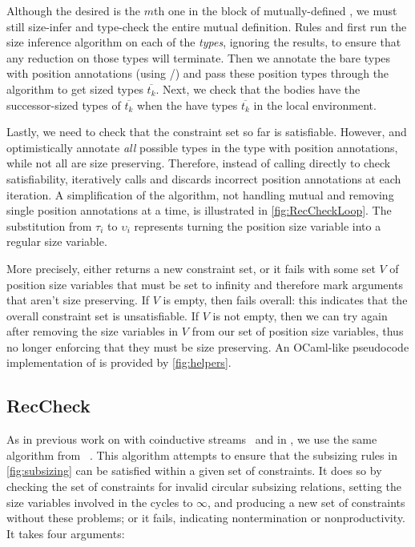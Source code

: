 Although the desired \cofixpoint is the $m$th one in the block of mutually-defined \cofixpoints, we must still size-infer and type-check the entire mutual definition.
Rules  and  first run the size inference algorithm on each of the \cofixpoint \emph{types}, ignoring the results, to ensure that any reduction on those types will terminate.
Then we annotate the bare types with position annotations (using \setrecstars/\setcorecstars) and pass these position types through the algorithm to get sized types $\overline{t_k}$.
Next, we check that the \cofixpoint bodies have the successor-sized types of $\overline{t_k}$ when the \cofixpoints have types $\overline{t_k}$ in the local environment.




Lastly, we need to check that the constraint set so far is satisfiable.
However, \setrecstars and \setcorecstars optimistically annotate \textit{all} possible \coinductive types in the \cofixpoint type with position annotations, while not all \cofixpoints are size preserving.
Therefore, instead of calling \RecCheck directly to check satisfiability,
\RecCheckLoop iteratively calls \RecCheck and discards incorrect position annotations at each iteration.
A simplification of the algorithm, not handling mutual \cofixpoints and removing single position annotations at a time,
is illustrated in \autoref{fig:RecCheckLoop}.
The substitution from $\tau_i$ to $\upsilon_i$ represents turning the position size variable into a regular size variable.

More precisely, \RecCheck either returns a new constraint set,
or it fails with some set $V$ of position size variables that must be set to infinity
and therefore mark arguments that aren't size preserving.
If $V$ is empty, then \RecCheckLoop fails overall: this indicates that the overall constraint set is unsatisfiable.
If $V$ is not empty, then we can try \RecCheck again after removing the size variables in $V$ from our set of position size variables,
thus no longer enforcing that they must be size preserving.
An OCaml-like pseudocode implementation of \RecCheckLoop is provided by \autoref{fig:helpers}.

\subsection{RecCheck}\label{sec:algorithm:reccheck}

As in previous work on \CChatomega with coinductive streams~\citep{cc-hat-omega} and in \CIChat, we use the same \RecCheck algorithm from \Fhat~\citep{f-hat}.
This algorithm attempts to ensure that the subsizing rules in \autoref{fig:subsizing} can be satisfied within a given set of constraints.
It does so by checking the set of constraints for invalid circular subsizing relations, setting the size variables involved in the cycles to $\infty$, and producing a new set of constraints without these problems; or it fails, indicating nontermination or nonproductivity.
It takes four arguments:

